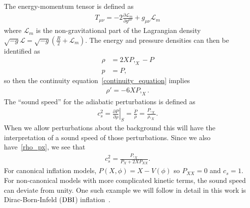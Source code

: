 The energy-momentum tensor is defined as
\begin{align}\label{gr_energy}
    T_{\mu\nu} = -2\frac{\partial\mathcal{L}_m}{\partial g^{\mu\nu}}+g_{\mu\nu}\mathcal{L}_m
\end{align}
where $\mathcal{L}_m$ is the non-gravitational part of the Lagrangian
density ${\sqrt{-g}\mathcal{L}=\sqrt{-g}\left(\frac{R}{2}+\mathcal{L}_m\right)}$.
The energy and pressure densities can then be identified as
\begin{align}\label{rho_px}
    \rho &= 2XP,_X-P\\
    p &= P,
\end{align}
so then the continuity equation~\eqref{continuity_equation} implies
\begin{align}\label{rho_deriv}
    \rho' = -6XP,_X.
\end{align}
    The ``sound speed'' for the adiabatic perturbations is defined as~\cite{Christopherson_2009}
    \begin{align}\label{sound_speed_definition}
        c_s^2 = \left. \frac{\partial P}{\partial \rho} \right|_S = \frac{\dot{P}}{\dot{\rho}}
        = \frac{P,_X}{\rho,_X}.
    \end{align}
    When we allow perturbations about the background this will have the interpretation
    of a sound speed of those perturbations.
    Since we also have~\eqref{rho_px}, we see that
    \begin{align}
        c_s^2 = \frac{P,_X}{P_X+2X P_{XX}}.
    \end{align}
    For canonical inflation models, $P(X,\phi)=X-V(\phi)$
    so $P_{XX}=0$ and $c_s=1$.
    For non-canonical models with more complicated kinetic terms,
    the sound speed can deviate from unity.
    One such example we will follow in detail in this work is
    Dirac-Born-Infeld ($\text{DBI}$) inflation~\cite{dbi_in_the_sky}.


